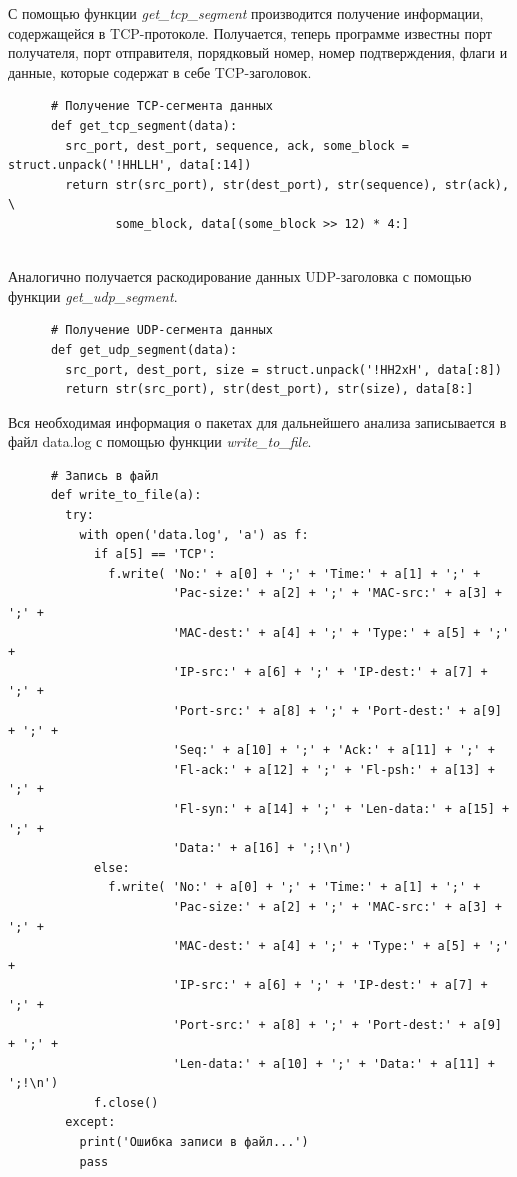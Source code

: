 \documentclass[bachelor, och, coursework]{SCWorks}
\begin{document}
    С помощью функции \textit{get\_tcp\_segment} производится получение информации, содержащейся в TCP-протоколе. Получается,
    теперь программе известны порт получателя, порт отправителя, порядковый номер, номер подтверждения, флаги и данные, которые
    содержат в себе TCP-заголовок.

    \begin{verbatim}
      # Получение TCP-cегмента данных
      def get_tcp_segment(data):
        src_port, dest_port, sequence, ack, some_block = struct.unpack('!HHLLH', data[:14])
        return str(src_port), str(dest_port), str(sequence), str(ack), \
               some_block, data[(some_block >> 12) * 4:]
    
    \end{verbatim}

   Аналогично получается раскодирование данных UDP-заголовка с помощью функции \textit{get\_udp\_segment}.

    \begin{verbatim}
      # Получение UDP-сегмента данных
      def get_udp_segment(data):
        src_port, dest_port, size = struct.unpack('!HH2xH', data[:8])
        return str(src_port), str(dest_port), str(size), data[8:]
    \end{verbatim}      

    Вся необходимая информация о пакетах для дальнейшего анализа записывается в файл data.log с помощью функции \textit{write\_to\_file}.
    
    \begin{verbatim}
      # Запись в файл
      def write_to_file(a):
        try:
          with open('data.log', 'a') as f:
            if a[5] == 'TCP':
              f.write( 'No:' + a[0] + ';' + 'Time:' + a[1] + ';' +
                       'Pac-size:' + a[2] + ';' + 'MAC-src:' + a[3] + ';' + 
                       'MAC-dest:' + a[4] + ';' + 'Type:' + a[5] + ';' +
                       'IP-src:' + a[6] + ';' + 'IP-dest:' + a[7] + ';' +
                       'Port-src:' + a[8] + ';' + 'Port-dest:' + a[9] + ';' +
                       'Seq:' + a[10] + ';' + 'Ack:' + a[11] + ';' +
                       'Fl-ack:' + a[12] + ';' + 'Fl-psh:' + a[13] + ';' +
                       'Fl-syn:' + a[14] + ';' + 'Len-data:' + a[15] + ';' + 
                       'Data:' + a[16] + ';!\n') 
            else:
              f.write( 'No:' + a[0] + ';' + 'Time:' + a[1] + ';' +
                       'Pac-size:' + a[2] + ';' + 'MAC-src:' + a[3] + ';' + 
                       'MAC-dest:' + a[4] + ';' + 'Type:' + a[5] + ';' +
                       'IP-src:' + a[6] + ';' + 'IP-dest:' + a[7] + ';' +
                       'Port-src:' + a[8] + ';' + 'Port-dest:' + a[9] + ';' +
                       'Len-data:' + a[10] + ';' + 'Data:' + a[11] + ';!\n')
            f.close()
        except:
          print('Ошибка записи в файл...')
          pass
    \end{verbatim}
\end{document}
